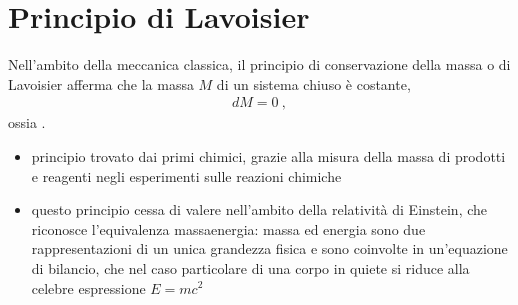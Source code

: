 \documentclass[letterpaper,10pt,italian]{jupyterBook}
\begin{document}
\section{Principio di Lavoisier}
\label{\detokenize{ch/thermodynamics/principles-lavoisier:principio-di-lavoisier}}\label{\detokenize{ch/thermodynamics/principles-lavoisier:physics-hs-thermodynamics-foundation-principles-lavoisier}}\label{\detokenize{ch/thermodynamics/principles-lavoisier::doc}}
\sphinxAtStartPar
Nell’ambito della meccanica classica, il principio di conservazione della massa \sphinxhyphen{} o di Lavoisier \sphinxhyphen{} afferma che la massa \(M\) di un sistema chiuso è costante,
\begin{equation*}
\begin{split}d M = 0 \ ,\end{split}
\end{equation*}
\sphinxAtStartPar
ossia .
\begin{itemize}
\item {} 
\sphinxAtStartPar
principio trovato dai primi chimici, grazie alla misura della massa di prodotti e reagenti negli esperimenti sulle reazioni chimiche

\item {} 
\sphinxAtStartPar
questo principio cessa di valere nell’ambito della relatività di Einstein, che riconosce l’equivalenza massa\sphinxhyphen{}energia: massa ed energia sono due rappresentazioni di un unica grandezza fisica e sono coinvolte in un’equazione di bilancio, che nel caso particolare di una corpo in quiete si riduce alla celebre espressione \(E = m c^2\)

\end{itemize}



\sphinxstepscope
\end{document}

